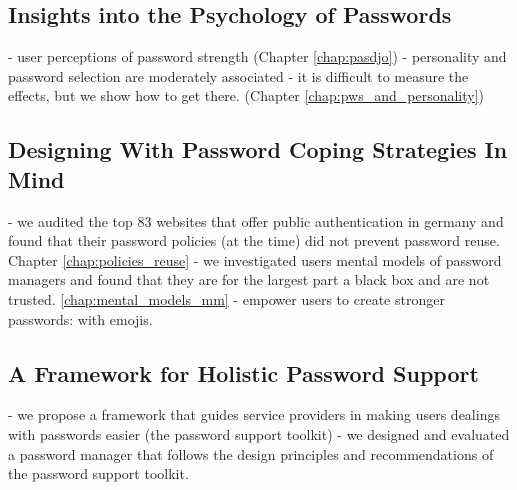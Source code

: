 \subsection{Insights into the Psychology of Passwords}
- user perceptions of password strength (Chapter \ref{chap:pasdjo})
- personality and password selection are moderately associated
- it is difficult to measure the effects, but we show how to get there. (Chapter \ref{chap:pws_and_personality})

\subsection{Designing With Password Coping Strategies In Mind}
- we audited the top 83 websites that offer public authentication in germany and found that their password policies (at the time) did not prevent password reuse. Chapter \ref{chap:policies_reuse}
- we investigated users mental models of password managers and found that they are for the largest part a black box and are not trusted. \ref{chap:mental_models_mm}
- empower users to create stronger passwords: with emojis. 


\subsection{A Framework for Holistic Password Support}
- we propose a framework that guides service providers in making users dealings with passwords easier (the password support toolkit)
- we designed and evaluated a password manager that follows the design principles and recommendations of the password support toolkit. 

